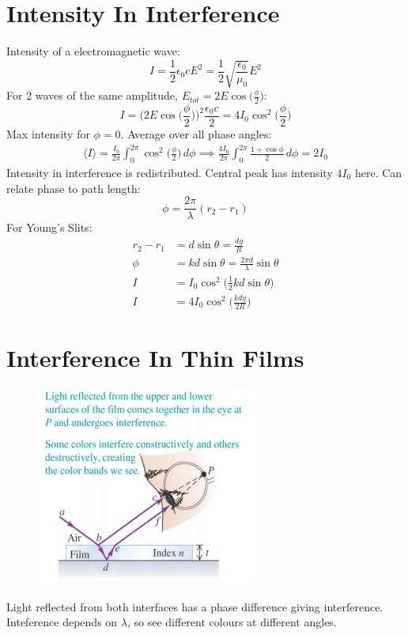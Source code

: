 \documentclass[a4paper, 11pt, normalem]{report}
\begin{document}
\section{Intensity In Interference}
Intensity of a electromagnetic wave:
\begin{equation}
    I = \frac{1}{2}\epsilon_{0}cE^{2} = \frac{1}{2}\sqrt{\frac{\epsilon_{0}}{\mu_{0}}}E^{2}
\end{equation}
For 2 waves of the same amplitude, $E_{tot} = 2E\cos{\Big(\frac{\phi}{2}\Big)}$:
\begin{equation}
    I = \Big(2E\cos{\Big(\frac{\phi}{2}\Big)}\Big)^{2} \frac{\epsilon_{0}c}{2} = 4I_{0}\cos^{2}{\Big(\frac{\phi}{2}\Big)}
\end{equation}
Max intensity for $\phi = 0$.
Average over all phase angles:
\begin{align}
    \langle I\rangle = \frac{I_{0}}{2\pi}\int_{0}^{2\pi}\cos^{2}{\Big(\frac{\phi}{2}\Big)}\, d\phi \implies \frac{4I_{0}}{2\pi}\int_{0}^{2\pi}\frac{1 + \cos{\phi}}{2}\, d\phi = 2I_{0}
\end{align}
Intensity in interference is redistributed.
Central peak has intensity $4I_{0}$ here.
Can relate phase to path length:
\begin{equation}
    \phi = \frac{2\pi}{\lambda}(r_{2} - r_{1})
\end{equation}
For Young's Slits:
\begin{align}
    r_{2} - r_{1} &= d\sin{\theta} = \frac{dy}{R} \\
    \phi &= kd\sin{\theta} = \frac{2\pi d}{\lambda}\sin{\theta} \\
    I &= I_{0}\cos^{2}{\Big(\frac{1}{2}kd\sin{\theta}\Big)} \\
    I &= 4I_{0}\cos^{2}{\Big(\frac{kdy}{2R}\Big)}
\end{align}

\section{Interference In Thin Films}
\begin{figure}[H]
    \centering
    \includegraphics{Film.jpg}
\end{figure}
Light reflected from both interfaces has a phase difference giving interference.
Inteference depends on $\lambda$, so see different colours at different angles.
\end{document}
